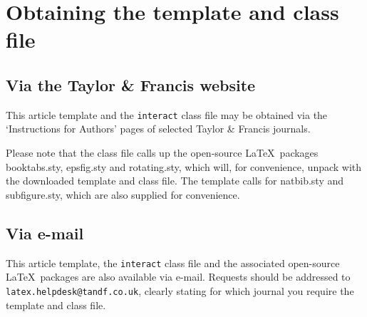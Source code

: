\documentclass[]{interact}
\theoremstyle{plain}%
\theoremstyle{definition}
\theoremstyle{remark}
\begin{document}
\section{Obtaining the template and class file}

\subsection{Via the Taylor \& Francis website}

This article template and the \texttt{interact} class file may be obtained via the `Instructions for Authors' pages of selected Taylor \& Francis journals.

Please note that the class file calls up the open-source \LaTeX\ packages booktabs.sty, epsfig.sty and rotating.sty, which will, for convenience, unpack with the downloaded template and class file. The template calls for natbib.sty and subfigure.sty, which are also supplied for convenience.


\subsection{Via e-mail}

This article template, the \texttt{interact} class file and the associated open-source \LaTeX\ packages are also available via e-mail. Requests should be addressed to \texttt{latex.helpdesk@tandf.co.uk}, clearly stating for which journal you require the template and class file.
\end{document}
